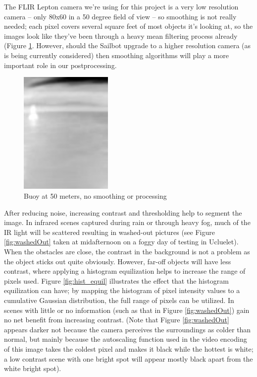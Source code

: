 The FLIR Lepton camera we're using for this project is a very low resolution camera -- only 80x60 in a 50 degree field of view -- so smoothing is not really needed; each pixel covers several square feet of most objects it's looking at, so the images look like they've been through a heavy mean filtering process already (Figure \ref{fig:buoy_ex}. However, should the Sailbot upgrade to a higher resolution camera (as is being currently considered) then smoothing algorithms will play a more important role in our postprocessing. 

\begin{figure}
\centering
\includegraphics[width=0.4\textwidth]{"./image/buoy_example"}
\caption{Buoy at 50 meters, no smoothing or processing}
\label{fig:buoy_ex}
\end{figure}

After reducing noise, increasing contrast and thresholding help to segment the image. In infrared scenes captured during rain or through heavy fog, much of the IR light will be scattered resulting in washed-out pictures (see Figure \ref{fig:washedOut} taken at midafternoon on a foggy day of testing in Ucluelet). When the obstacles are close, the contrast in the background is not a problem as the object sticks out quite obviously. However, far-off objects will have less contrast, where applying a histogram equilization helps to increase the range of pixels used. Figure \ref{fig:hist_equil} illustrates the effect that the histogram equilization can have; by mapping the histogram of pixel intensity values to a cumulative Gaussian distribution, the full range of pixels can be utilized. In scenes with little or no information (such as that in Figure \ref{fig:washedOut}) gain no net benefit from increasing contrast. (Note that Figure \ref{fig:washedOut} appears darker not because the camera perceives the surroundings as colder than normal, but mainly because the autoscaling function used in the video encoding of this image takes the coldest pixel and makes it black while the hottest is white; a low contrast scene with one bright spot will appear mostly black apart from the white bright spot).

